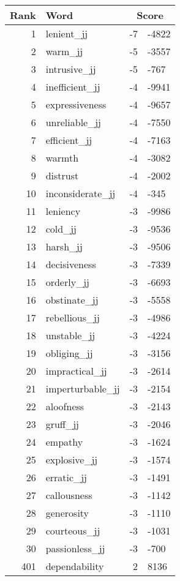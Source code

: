 \begin{longtable}[!htbp]{| rlr@{.}l |}
    \hline
    \textbf{Rank} & \textbf{Word} & \multicolumn{2}{c|}{\textbf{Score}} \\
    \hline
    \endhead
    1 & lenient\_jj & -7 & -4822 \\
    2 & warm\_jj & -5 & -3557 \\
    3 & intrusive\_jj & -5 & -767 \\
    4 & inefficient\_jj & -4 & -9941 \\
    5 & expressiveness & -4 & -9657 \\
    6 & unreliable\_jj & -4 & -7550 \\
    7 & efficient\_jj & -4 & -7163 \\
    8 & warmth & -4 & -3082 \\
    9 & distrust & -4 & -2002 \\
    10 & inconsiderate\_jj & -4 & -345 \\
    11 & leniency & -3 & -9986 \\
    12 & cold\_jj & -3 & -9536 \\
    13 & harsh\_jj & -3 & -9506 \\
    14 & decisiveness & -3 & -7339 \\
    15 & orderly\_jj & -3 & -6693 \\
    16 & obstinate\_jj & -3 & -5558 \\
    17 & rebellious\_jj & -3 & -4986 \\
    18 & unstable\_jj & -3 & -4224 \\
    19 & obliging\_jj & -3 & -3156 \\
    20 & impractical\_jj & -3 & -2614 \\
    21 & imperturbable\_jj & -3 & -2154 \\
    22 & aloofness & -3 & -2143 \\
    23 & gruff\_jj & -3 & -2046 \\
    24 & empathy & -3 & -1624 \\
    25 & explosive\_jj & -3 & -1574 \\
    26 & erratic\_jj & -3 & -1491 \\
    27 & callousness & -3 & -1142 \\
    28 & generosity & -3 & -1110 \\
    29 & courteous\_jj & -3 & -1031 \\
    30 & passionless\_jj & -3 & -700 \\
    401 & dependability & 2 & 8136 \\

\end{longtable}
